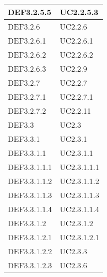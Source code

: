 \documentclass{scalatekids-article}
\begin{document}
\begin{longtable}[H]{|p{5.5cm}|p{5.5cm}|}
  \hline
  DEF3.2.5.5 & \multiLineCell[t]{UC2.2.5.3\\}\\
  \hline
  DEF3.2.6 & \multiLineCell[t]{UC2.2.6\\}\\
  \hline
  DEF3.2.6.1 & \multiLineCell[t]{UC2.2.6.1\\}\\
  \hline
  DEF3.2.6.2 & \multiLineCell[t]{UC2.2.6.2\\}\\
  \hline
  DEF3.2.6.3 & \multiLineCell[t]{UC2.2.9\\}\\
  \hline
  DEF3.2.7 & \multiLineCell[t]{UC2.2.7\\}\\
  \hline
  DEF3.2.7.1 & \multiLineCell[t]{UC2.2.7.1\\}\\
  \hline
  DEF3.2.7.2 & \multiLineCell[t]{UC2.2.11\\}\\
  \hline
  DEF3.3 & \multiLineCell[t]{UC2.3\\}\\
  \hline
  DEF3.3.1 & \multiLineCell[t]{UC2.3.1\\}\\
  \hline
  DEF3.3.1.1 & \multiLineCell[t]{UC2.3.1.1\\}\\
  \hline
  DEF3.3.1.1.1 & \multiLineCell[t]{UC2.3.1.1.1\\}\\
  \hline
  DEF3.3.1.1.2 & \multiLineCell[t]{UC2.3.1.1.2\\}\\
  \hline
  DEF3.3.1.1.3 & \multiLineCell[t]{UC2.3.1.1.3\\}\\
  \hline
  DEF3.3.1.1.4 & \multiLineCell[t]{UC2.3.1.1.4\\}\\
  \hline
  DEF3.3.1.2 & \multiLineCell[t]{UC2.3.1.2\\}\\
  \hline
  DEF3.3.1.2.1 & \multiLineCell[t]{UC2.3.1.2.1\\}\\
  \hline
  DEF3.3.1.2.2 & \multiLineCell[t]{UC2.3.3\\}\\
  \hline
  DEF3.3.1.2.3 & \multiLineCell[t]{UC2.3.6\\}\\

\end{longtable}
\end{document}

